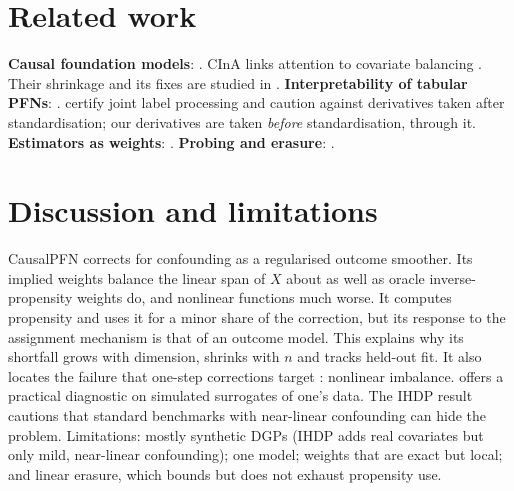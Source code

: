 \documentclass{article}
\begin{document}
\section{Related work}
\textbf{Causal foundation models}: \citet{balazadeh2025causalpfn,robertson2025dopfn,ma2025causalfm,stith2026cfmsurvey}. CInA links attention to covariate balancing \citep{zhang2023cina}. Their shrinkage and its fixes are studied in \citet{melnychuk2026frequentist,zhang2026fluctuate,ham2026posttreatment}. \textbf{Interpretability of tabular PFNs}: \citet{bilos2026mechanistic,gupta2026tabpfnheads,gong2026depth,shaheen2026generalization}. \citet{nguyen2026standardization} certify joint label processing and caution against derivatives taken after standardisation; our derivatives are taken \emph{before} standardisation, through it. \textbf{Estimators as weights}: \citet{chattopadhyay2021implied,knaus2024weighted,han2026imputation}. \textbf{Probing and erasure}: \citet{belinkov2022probing,elazar2021amnesic,belrose2023leace}.

\section{Discussion and limitations}
CausalPFN corrects for confounding as a regularised outcome smoother. Its implied weights balance the linear span of $X$ about as well as oracle inverse-propensity weights do, and nonlinear functions much worse. It computes propensity and uses it for a minor share of the correction, but its response to the assignment mechanism is that of an outcome model. This explains why its shortfall grows with dimension, shrinks with $n$ and tracks held-out fit. It also locates the failure that one-step corrections target \citep{melnychuk2026frequentist}: nonlinear imbalance.  offers a practical diagnostic on simulated surrogates of one's data. The IHDP result cautions that standard benchmarks with near-linear confounding can hide the problem. Limitations: mostly synthetic DGPs (IHDP adds real covariates but only mild, near-linear confounding); one model; weights that are exact but local; and linear erasure, which bounds but does not exhaust propensity use.




\appendix
\end{document}
